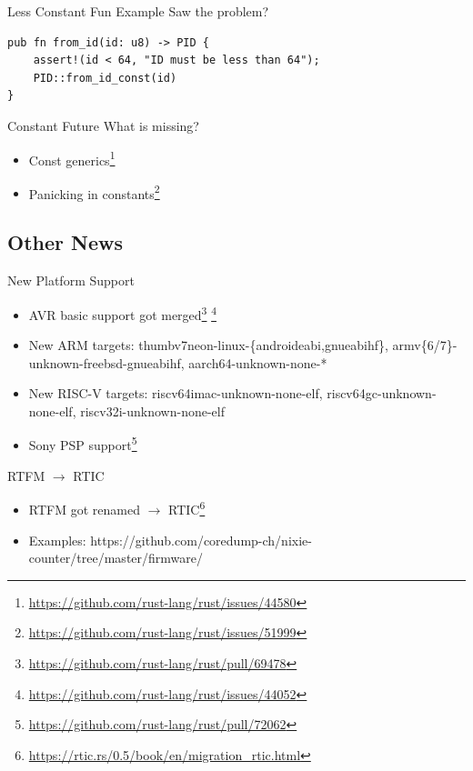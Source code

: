 \documentclass[aspectratio=1610,14pt,t]{beamer}
\begin{document}
\begin{frame}[c,fragile]{Less Constant Fun Example}
  Saw the problem?\pause
  \begin{verbatim}
pub fn from_id(id: u8) -> PID {
    assert!(id < 64, "ID must be less than 64");
    PID::from_id_const(id)
}
  \end{verbatim}

\end{frame}

\begin{frame}{Constant Future}
  What is missing?
  \begin{itemize}
    \item Const generics\footnote{\url{https://github.com/rust-lang/rust/issues/44580}}
    \item Panicking in constants\footnote{\url{https://github.com/rust-lang/rust/issues/51999}}
  \end{itemize}
\end{frame}

\subsection{Other News}

\begin{frame}[c]{New Platform Support}
  \begin{itemize}
    \item AVR basic support got merged\footnote{\url{https://github.com/rust-lang/rust/pull/69478}} \footnote{\url{https://github.com/rust-lang/rust/issues/44052}}
    \item New ARM targets: thumbv7neon-linux-\{androideabi,gnueabihf\}, armv\{6/7\}-unknown-freebsd-gnueabihf, aarch64-unknown-none-*
    \item New RISC-V targets: riscv64imac-unknown-none-elf, riscv64gc-unknown-none-elf, riscv32i-unknown-none-elf
    \item Sony PSP support\footnote{\url{https://github.com/rust-lang/rust/pull/72062}}
  \end{itemize}
\end{frame}

\begin{frame}[c]{RTFM $\rightarrow$ RTIC}
  \begin{itemize}
    \item RTFM got renamed $\rightarrow$ RTIC\footnote{\url{https://rtic.rs/0.5/book/en/migration_rtic.html}}
    \item Examples: https://github.com/coredump-ch/nixie-counter/tree/master/firmware/
  \end{itemize}
\end{frame}
\end{document}
